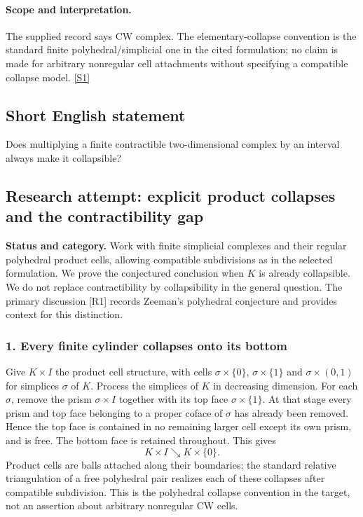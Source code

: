 \documentclass[11pt,a4paper]{article}
\newcommand{\sref}[2]{\hyperlink{source:#1:#2}{[S#2]}}
\begin{document}
\paragraph{Scope and interpretation.}

The supplied record says CW complex. The elementary-collapse convention is the standard finite polyhedral/simplicial one in the cited formulation; no claim is made for arbitrary nonregular cell attachments without specifying a compatible collapse model. \sref{1487}{1}

\subsection{Short English statement}

Does multiplying a finite contractible two-dimensional complex by an interval always make it collapsible?

\subsection{Research attempt: explicit product collapses and the contractibility gap}
\textbf{Status and category.} Work with finite simplicial complexes and their regular polyhedral product cells, allowing compatible subdivisions as in the selected formulation. We prove the conjectured conclusion when $K$ is already collapsible. We do not replace contractibility by collapsibility in the general question. The primary discussion [R1] records Zeeman's polyhedral conjecture and provides context for this distinction.

\subsubsection{1. Every finite cylinder collapses onto its bottom}
Give $K\times I$ the product cell structure, with cells $\sigma\times\{0\}$, $\sigma\times\{1\}$ and $\sigma\times(0,1)$ for simplices $\sigma$ of $K$. Process the simplices of $K$ in decreasing dimension. For each $\sigma$, remove the prism $\sigma\times I$ together with its top face $\sigma\times\{1\}$. At that stage every prism and top face belonging to a proper coface of $\sigma$ has already been removed. Hence the top face is contained in no remaining larger cell except its own prism, and is free. The bottom face is retained throughout. This gives
\[K\times I\searrow K\times\{0\}.\tag{1}\]
Product cells are balls attached along their boundaries; the standard relative triangulation of a free polyhedral pair realizes each of these collapses after compatible subdivision. This is the polyhedral collapse convention in the target, not an assertion about arbitrary nonregular CW cells.
\end{document}
